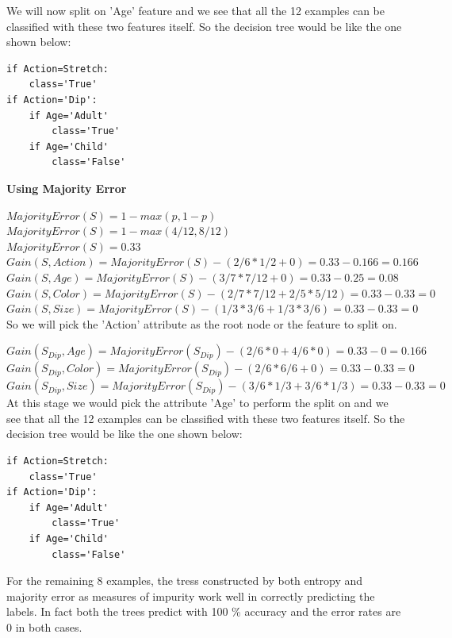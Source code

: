 \documentclass[11pt]{article}
\begin{document}
\begin{enumerate}
\begin{enumerate}
		We will now split on 'Age' feature and we see that all the 12 examples can be classified with these two features itself. So the decision tree would be like the one shown below:\\
		
\begin{lstlisting}
if Action=Stretch:
	class='True'
if Action='Dip':
	if Age='Adult'
		class='True'
	if Age='Child'
		class='False'		
\end{lstlisting}
			
	\textbf{ Using Majority Error}
	
	$MajorityError(S)=1 -max(p,1-p)$\\
	$MajorityError(S)=1 -max(4/12,8/12)$\\
	$MajorityError(S)=0.33$\\		
	
	$Gain(S, Action)= MajorityError(S) - (2/6 *1/2  +0) =0.33- 0.166 =0.166$\\	
	$Gain(S, Age)= MajorityError(S) - (3/7 *7/12  +0) =0.33- 0.25 =0.08$\\			
	$Gain(S, Color)= MajorityError(S) - (2/7 *7/12  +2/5*5/12) =0.33- 0.33 =0$\\		
	$Gain(S, Size)= MajorityError(S) - (1/3 *3/6  +1/3*3/6) =0.33- 0.33 =0$\\		
	
	So we will pick the 'Action' attribute as the root node or the feature to split on.
	
	$Gain(S_{Dip}, Age)= MajorityError(S_{Dip}) - (2/6 * 0  +4/6 * 0) =0.33- 0 =0.166$\\	
	$Gain(S_{Dip}, Color)= MajorityError(S_{Dip}) - (2/6*6/6 +0) =0.33- 0.33 =0$\\
	$Gain(S_{Dip}, Size)= MajorityError(S_{Dip}) - (3/6*1/3 +3/6*1/3) =0.33- 0.33 =0$\\
	
	At this stage we would pick the attribute 'Age' to perform the split on and we see that all the 12 examples can be classified with these two features itself. So the decision tree would be like the one shown below:\\
	
	\begin{lstlisting}
if Action=Stretch:
	class='True'
if Action='Dip':
	if Age='Adult'
		class='True'
	if Age='Child'
		class='False'		
\end{lstlisting}
	
For the remaining 8 examples, the tress constructed by both entropy and majority error as measures of impurity work well in correctly predicting the labels. In fact both the trees predict with 100 \% accuracy and the error rates are 0 in both cases.\\


\end{enumerate}
\end{enumerate}
\end{document}
